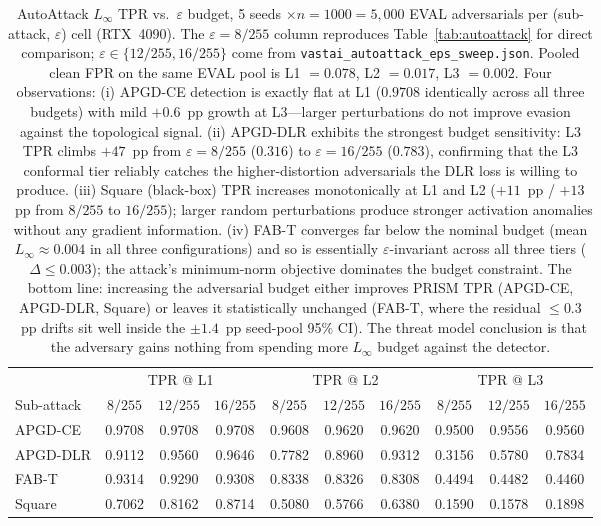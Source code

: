 \begin{table}[h]
\centering
\small
\setlength{\tabcolsep}{4pt}
\begin{tabular}{l|ccc|ccc|ccc}
\toprule
 & \multicolumn{3}{c|}{TPR @ L1} & \multicolumn{3}{c|}{TPR @ L2} & \multicolumn{3}{c}{TPR @ L3} \\
Sub-attack & $8/255$ & $12/255$ & $16/255$ & $8/255$ & $12/255$ & $16/255$ & $8/255$ & $12/255$ & $16/255$ \\
\midrule
APGD-CE  & 0.9708 & 0.9708 & 0.9708 & 0.9608 & 0.9620 & 0.9620 & 0.9500 & 0.9556 & 0.9560 \\
APGD-DLR & 0.9112 & 0.9560 & 0.9646 & 0.7782 & 0.8960 & 0.9312 & 0.3156 & 0.5780 & 0.7834 \\
FAB-T    & 0.9314 & 0.9290 & 0.9308 & 0.8338 & 0.8326 & 0.8308 & 0.4494 & 0.4482 & 0.4460 \\
Square   & 0.7062 & 0.8162 & 0.8714 & 0.5080 & 0.5766 & 0.6380 & 0.1590 & 0.1578 & 0.1898 \\
\bottomrule
\end{tabular}
\caption{AutoAttack $L_\infty$ TPR vs.\ $\varepsilon$ budget, 5 seeds
$\times n{=}1000 = 5{,}000$ EVAL adversarials per (sub-attack, $\varepsilon$) cell
(RTX~4090). The $\varepsilon{=}8/255$ column reproduces Table~\ref{tab:autoattack}
for direct comparison; $\varepsilon \in \{12/255,16/255\}$ come from
\texttt{vastai\_autoattack\_eps\_sweep.json}. Pooled clean FPR on the same EVAL
pool is L1 $=0.078$, L2 $=0.017$, L3 $=0.002$. Four observations:
(i) APGD-CE detection is exactly flat at L1 ($0.9708$ identically across all
three budgets) with mild $+0.6$~pp growth at L3---larger perturbations do
not improve evasion against the topological signal.
(ii) APGD-DLR exhibits the strongest budget sensitivity: L3 TPR climbs
$+47$~pp from $\varepsilon{=}8/255$ ($0.316$) to $\varepsilon{=}16/255$
($0.783$), confirming that the L3 conformal tier reliably catches the
higher-distortion adversarials the DLR loss is willing to produce.
(iii) Square (black-box) TPR increases monotonically at L1 and L2
($+11$~pp / $+13$~pp from $8/255$ to $16/255$); larger random perturbations
produce stronger activation anomalies without any gradient information.
(iv) FAB-T converges far below the nominal budget (mean $L_\infty \approx 0.004$
in all three configurations) and so is essentially $\varepsilon$-invariant
across all three tiers ($\Delta \le 0.003$); the attack's minimum-norm
objective dominates the budget constraint.
The bottom line: increasing the adversarial budget either improves PRISM
TPR (APGD-CE, APGD-DLR, Square) or leaves it statistically unchanged
(FAB-T, where the residual $\le 0.3$~pp drifts sit well inside the
$\pm 1.4$~pp seed-pool 95\% CI). The threat model conclusion is that
the adversary gains nothing from spending more $L_\infty$ budget against
the detector.}
\label{tab:aa_eps_sweep}
\end{table}

